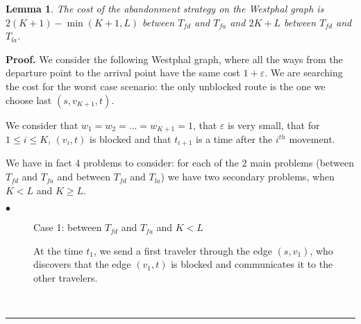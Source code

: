 \documentclass[a4paper, 10pt]{article}
\newtheorem{lemma}{Lemma}
\newenvironment{proof}[1][Proof]{\textbf{#1.} }{\ \rule{0.5em}{0.5em}}
\begin{document}
\begin{lemma} The cost of the abandonment strategy on the Westphal graph is $2(K+1) - \min(K+1,L)$ between $T_{fd}$ and $T_{fa}$ and $2K+L$ between $T_{fd}$ and $T_{la}$.
\end{lemma}


\begin{proof}We consider the following Westphal graph, where all the ways from the departure point to the arrival point have the same cost $1+\varepsilon$. We are searching the cost for the worst case scenario: the only unblocked route is the one we choose last $(s,v_{K+1},t)$.

\begin{center}
\end{center}

We consider that $w_1 = w_2 = ... = w_{K+1} = 1$, that $\varepsilon$ is very small, that for $1\leq i \leq K$, $(v_i,t)$ is blocked and that $t_{i+1}$ is a time after the $i^{th}$ movement.

We have in fact 4 problems to consider: for each of the 2 main problems (between $T_{fd}$ and $T_{fa}$ and between $T_{fd}$ and $ T_{la}$) we have two secondary problems, when $K<L$ and ${K \geq L}$.

\begin{description}
\item[$\bullet$] Case 1: between $T_{fd}$ and $T_{fa}$ and $K<L$

At the time $t_1$, we send a first traveler through the edge $(s,v_1)$, who discovers that the edge $(v_1,t)$ is blocked and communicates it to the other travelers.


\end{description}
\end{proof}
\end{document}
